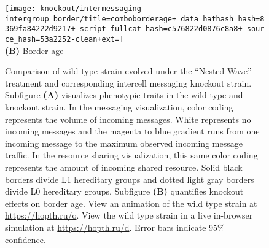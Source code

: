 \begin{figure}[!htbp]
\begin{center}
\begin{minipage}[t]{0.5\linewidth}
\hspace*{\fill}%
\begin{minipage}[t]{0.8\linewidth}
\centering
\vspace{0pt} %
\begin{minipage}[b]{\textwidth}
\texttt{[image: knockout/intermessaging-intergroup\_border/title=comboborderage+\_data\_hathash\_hash=8369fa84222d9217+\_script\_fullcat\_hash=c576822d0876c8a8+\_source\_hash=53a2252-clean+ext=]}\\
{\textbf{(B)} Border age}
\end{minipage}
\end{minipage}%
\hspace*{\fill}

\vspace{1ex}


\end{minipage}

\caption{
Comparison of wild type strain evolved under the ``Nested-Wave'' treatment and corresponding intercell messaging knockout strain.
Subfigure \textbf{(A)} visualizes phenotypic traits in the wild type and knockout strain.
In the messaging visualization, color coding represents the volume of incoming messages.
White represents no incoming messages and the magenta to blue gradient runs from one incoming message to the maximum observed incoming message traffic.
In the resource sharing visualization, this same color coding represents the amount of incoming shared resource.
Solid black borders divide L1 hereditary groups and dotted light gray borders divide L0 hereditary groups.
Subfigure \textbf{(B)} quantifies knockout effects on border age.
View an animation of the wild type strain at \url{https://hopth.ru/o}.
View the wild type strain in a live in-browser simulation at \url{https://hopth.ru/d}.
Error bars indicate 95\% confidence.
}
\label{fig:ko-intermessaging-intergroup_border}


\end{center}
\end{figure}
